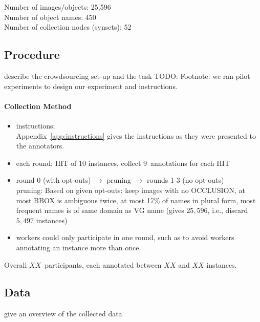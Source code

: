 Number of images/objects:        25,596\\
Number of object names:  450\\
Number of collection nodes (synsets):    52 \\

\subsection{Procedure} describe the crowdsourcing set-up and the task
TODO: Footnote: we ran pilot experiments to design our experiment and instructions.
\paragraph{Collection Method}
\begin{itemize}
	\item instructions; \\
	Appendix~\ref{app:instructions} gives the instructions as they were presented to the annotators. 
	\item each round: HIT of 10 instances, collect 9~annotations for each HIT
	\item round 0 (with opt-outs) $\rightarrow$ pruning $\rightarrow$ rounds 1-3 (no opt-outs)\\
	pruning: Based on given opt-outs: keep images with no OCCLUSION, at most BBOX is ambiguous twice, at most 17\% of names in plural form, most frequent names is of same domain as VG name (gives $25,596$, i.e., discard $5,497$ instances)
	\item workers could only participate in one round, such as to avoid workers annotating an instance more than once. 
\end{itemize}

Overall $XX$~participants, each annotated between $XX$ and $XX$ instances. 

\subsection{Data} give an overview of the collected data



